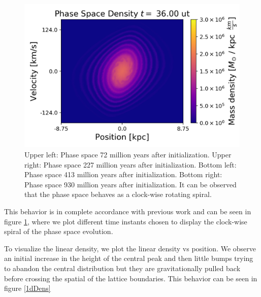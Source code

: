 \begin{figure}[h!]
    \includegraphics[scale=0.45]{imag/gauss90.png}
    \caption{Upper left: Phase space 72 million years after initialization. Upper right: Phase space 227 million years after initialization. Bottom left: Phase space 413 million years after initialization. Bottom right: Phase space 930 million years after initialization. It can be observed that the phase space behaves as a clock-wise rotating spiral.}
    \label{1dphase}
\end{figure}


This behavior is in complete accordance with previous work and can be seen in figure \ref{1dphase}, where we plot different time instants chosen to display the clock-wise spiral of the phase space evolution.

To visualize the linear density, we plot the linear density vs position. We observe an initial increase in the height of the central peak and then little bumps trying to abandon the central distribution but they are gravitationally pulled back before crossing the spatial of the lattice boundaries. This behavior can be seen in figure \ref{1dDens}




